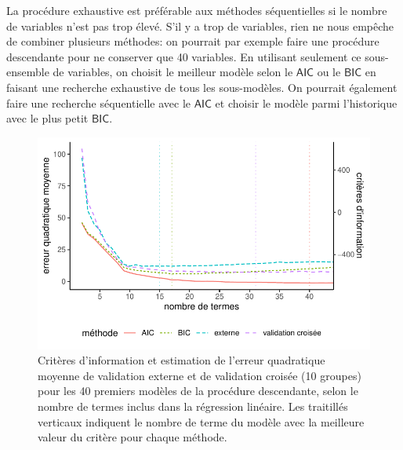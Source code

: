 \documentclass[
  11pt,
  letterpaper,
]{scrbook}
\theoremstyle{definition}
\theoremstyle{remark}
\begin{document}
La procédure exhaustive est préférable aux méthodes séquentielles si le
nombre de variables n'est pas trop élevé. S'il y a trop de variables,
rien ne nous empêche de combiner plusieurs méthodes: on pourrait par
exemple faire une procédure descendante pour ne conserver que 40
variables. En utilisant seulement ce sous-ensemble de variables, on
choisit le meilleur modèle selon le \(\mathsf{AIC}\) ou le
\(\mathsf{BIC}\) en faisant une recherche exhaustive de tous les
sous-modèles. On pourrait également faire une recherche séquentielle
avec le \(\mathsf{AIC}\) et choisir le modèle parmi l'historique avec le
plus petit \(\mathsf{BIC}\).

\begin{figure}[ht!]

{\centering \includegraphics[width=1\textwidth,height=\textheight]{selectionmodeles_files/figure-pdf/fig-perfo-sequentiel-1.pdf}

}

\caption{\label{fig-perfo-sequentiel}Critères d'information et
estimation de l'erreur quadratique moyenne de validation externe et de
validation croisée (10 groupes) pour les 40 premiers modèles de la
procédure descendante, selon le nombre de termes inclus dans la
régression linéaire. Les traitillés verticaux indiquent le nombre de
terme du modèle avec la meilleure valeur du critère pour chaque
méthode.}

\end{figure}
\end{document}
